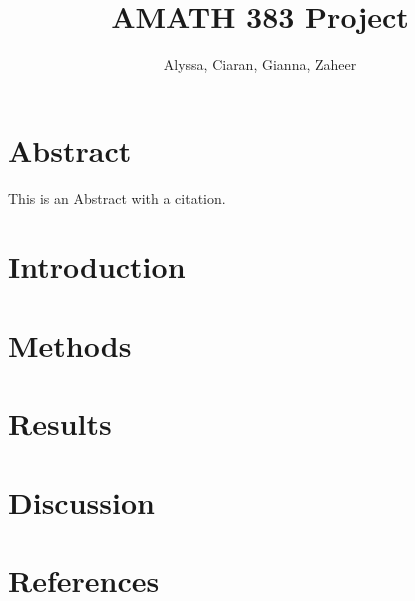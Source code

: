 \documentclass{article}
\title{AMATH 383 Project}
\author{Alyssa, Ciaran, Gianna, Zaheer}
\begin{document}
    \maketitle
    

    \section{Abstract}
    This is an Abstract with a citation\cite{gonzalez-bailon_dynamics_2011}.
    \section{Introduction}
    \section{Methods}
    \section{Results}
    \section{Discussion}
    \section{References}
    
    
    
\end{document}
